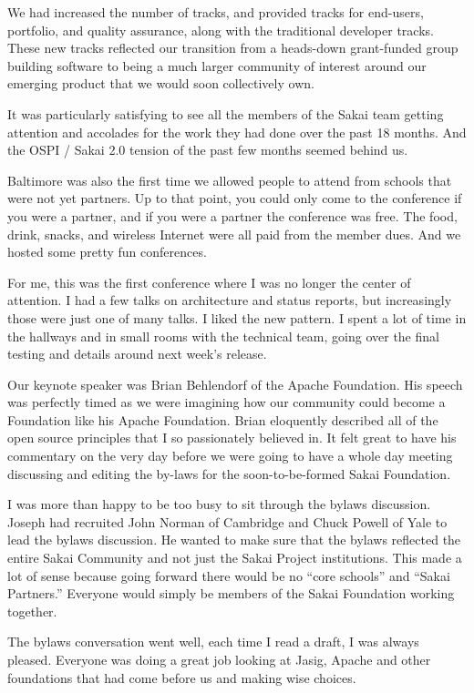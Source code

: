 \documentclass[12pt]{book}
\begin{document}
We had increased the number of tracks, and provided tracks
for end-users, portfolio, and quality assurance, along with the
traditional developer tracks.  These new tracks reflected
our transition from a heads-down grant-funded group building
software to being a much larger community of interest around
our emerging product that we would soon collectively own.

It was particularly satisfying to see all the members of the
Sakai team getting attention and accolades for the work they
had done over the past 18 months.  And the OSPI / Sakai 2.0
tension of the past few months seemed behind
us.

Baltimore was also the first time we allowed people to attend
from schools that were not yet partners.  Up to that point,
you could only come to the conference if you were a partner,
and if you were a partner the conference was free.  The food,
drink, snacks, and wireless Internet were all paid from the
member dues.  And we hosted some pretty fun conferences.

For me, this was the first conference where I was no longer the
center of attention.  I had a few talks on architecture and status
reports, but increasingly those were just one of many talks.  I
liked the new pattern.  I spent a lot of time in the
hallways and in small rooms with the technical team, going over
the final testing and details around next week's release.

Our keynote speaker was Brian Behlendorf of the Apache
Foundation.  His speech was perfectly timed as we were imagining
how our community could become a Foundation like his Apache Foundation.
Brian eloquently described all of the open source principles
that I so passionately believed in.  It felt great to have his
commentary on the very day before we were going to have a
whole day meeting discussing and editing the by-laws for the
soon-to-be-formed Sakai Foundation.

I was more than happy to be too busy to sit through the bylaws
discussion.   Joseph had recruited John Norman of Cambridge and
Chuck Powell of Yale to lead the bylaws discussion.   He wanted
to make sure that the bylaws reflected the entire Sakai Community
and not just the Sakai Project institutions.  This made a lot
of sense because going forward there would be no ``core schools''
and ``Sakai Partners.''  Everyone would simply be members of the
Sakai Foundation working together.

The bylaws conversation went well, each time I read
a draft, I was always pleased.   Everyone was doing a great
job looking at Jasig, Apache and other foundations that had
come before us and making wise choices.
\end{document}
